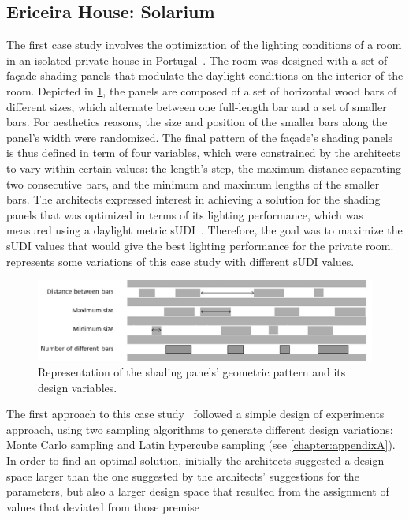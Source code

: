\subsection{Ericeira House: Solarium}

The first case study involves the optimization of the lighting conditions of a room in an isolated private house in Portugal~\cite{Caetano2018,Belem2018optimizeddesign}. The room was designed with a set of façade shading panels that modulate the daylight conditions on the interior of the room. Depicted in \cref{fig:ericeira_panels_explanation}, the panels are composed of a set of horizontal wood bars of different sizes, which alternate between one full-length bar and a set of smaller bars. For aesthetics reasons, the size and position of the smaller bars along the panel's width were randomized. The final pattern of the façade's shading panels is thus defined in term of four variables, which were constrained by the architects to vary within certain values: the length’s step, the maximum distance separating two consecutive bars, and the minimum and maximum lengths of the smaller bars. The architects expressed interest in achieving a solution for the shading panels that was optimized in terms of its lighting performance, which was measured using a daylight metric \ac{sUDI}~\cite{Nabil2006}. Therefore, the goal was to maximize the \ac{sUDI} values that would give the best lighting performance for the private room.  represents some variations of this case study with different \ac{sUDI} values.

\begin{figure}[htbp]
	\centering
	\includegraphics[width=\textwidth]{Images/Evaluation/Ericeira_1.jpg}
	\caption{Representation of the shading panels' geometric pattern and its design variables.}
	\label{fig:ericeira_panels_explanation}
\end{figure}
The first approach to this case study~\cite{Caetano2018} followed a simple design of experiments approach, using two sampling algorithms to generate different design variations: Monte Carlo sampling and Latin hypercube sampling (see \cref{chapter:appendixA}). In order to find an optimal solution, initially the architects suggested  a design space larger than the one suggested by the architects’ suggestions for the parameters, but also a larger design space that resulted from the assignment of values that deviated from those premise

